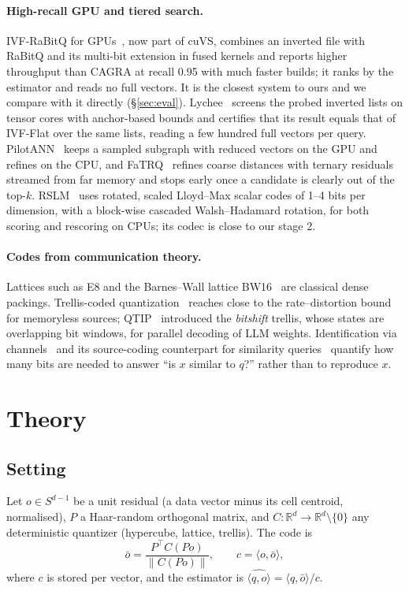 \documentclass[fleqn,10pt]{wlscirep}
\begin{document}
\paragraph{High-recall GPU and tiered search.} IVF-RaBitQ for GPUs~\cite{shi2026ivfrabitq}, now part of cuVS, combines an inverted file with RaBitQ and its multi-bit extension in fused kernels and reports higher throughput than CAGRA at recall 0.95 with much faster builds; it ranks by the estimator and reads no full vectors. It is the closest system to ours and we compare with it directly (\S\ref{sec:eval}). Lychee~\cite{zhao2026lychee} screens the probed inverted lists on tensor cores with anchor-based bounds and certifies that its result equals that of IVF-Flat over the same lists, reading a few hundred full vectors per query. PilotANN~\cite{gui2026pilotann} keeps a sampled subgraph with reduced vectors on the GPU and refines on the CPU, and FaTRQ~\cite{zhang2026fatrq} refines coarse distances with ternary residuals streamed from far memory and stops early once a candidate is clearly out of the top-$k$. RSLM~\cite{lenhardt2026rslm} uses rotated, scaled Lloyd--Max scalar codes of 1--4 bits per dimension, with a block-wise cascaded Walsh--Hadamard rotation, for both scoring and rescoring on CPUs; its codec is close to our stage 2.

\paragraph{Codes from communication theory.} Lattices such as E8 and the Barnes--Wall lattice BW16~\cite{conway1999sphere} are classical dense packings. Trellis-coded quantization~\cite{marcellin1990tcq} reaches close to the rate--distortion bound for memoryless sources; QTIP~\cite{tseng2024qtip} introduced the \emph{bitshift} trellis, whose states are overlapping bit windows, for parallel decoding of LLM weights. Identification via channels~\cite{ahlswede1989identification} and its source-coding counterpart for similarity queries~\cite{ingber2015identification} quantify how many bits are needed to answer ``is $x$ similar to $q$?'' rather than to reproduce $x$.

\section{Theory}\label{sec:theory}
\subsection{Setting}
Let $o\in S^{d-1}$ be a unit residual (a data vector minus its cell centroid, normalised), $P$ a Haar-random orthogonal matrix, and $C:\mathbb{R}^d\to\mathbb{R}^d\setminus\{0\}$ any deterministic quantizer (hypercube, lattice, trellis). The code is
\[
\bar o=\frac{P^\top C(Po)}{\|C(Po)\|},\qquad c=\langle o,\bar o\rangle,
\]
where $c$ is stored per vector, and the estimator is $\widehat{\langle q,o\rangle}=\langle q,\bar o\rangle/c$.
\end{document}
